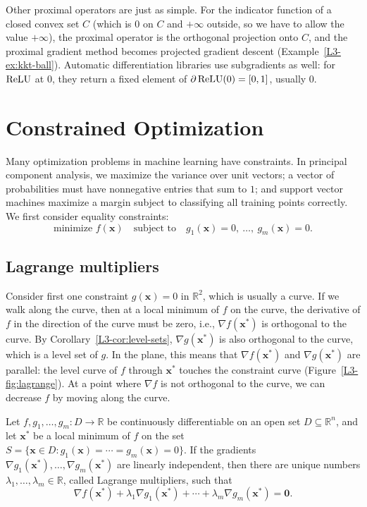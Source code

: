 Other proximal operators are just as simple. For the indicator function of a closed convex set $C$ (which is $0$ on $C$ and $+\infty$ outside, so we have to allow the value $+\infty$), the proximal operator is the orthogonal projection onto $C$, and the proximal gradient method becomes projected gradient descent (Example~\ref{L3-ex:kkt-ball}). Automatic differentiation libraries use subgradients as well: for $\operatorname{ReLU}$ at $0$, they return a fixed element of $\partial\operatorname{ReLU}(0) = [0, 1]$, usually $0$.

\section{Constrained Optimization}\label{L3-sec:constrained}

Many optimization problems in machine learning have constraints. In principal component analysis, we maximize the variance over unit vectors; a vector of probabilities must have nonnegative entries that sum to $1$; and support vector machines maximize a margin subject to classifying all training points correctly. We first consider equality constraints:
\[\text{minimize } f(\mathbf{x}) \quad \text{subject to} \quad g_1(\mathbf{x}) = 0, \ \ldots, \ g_m(\mathbf{x}) = 0.\]

\subsection{Lagrange multipliers}

Consider first one constraint $g(\mathbf{x}) = 0$ in $\mathbb{R}^2$, which is usually a curve. If we walk along the curve, then at a local minimum of $f$ on the curve, the derivative of $f$ in the direction of the curve must be zero, i.e., $\nabla f(\mathbf{x}^*)$ is orthogonal to the curve. By Corollary~\ref{L3-cor:level-sets}, $\nabla g(\mathbf{x}^*)$ is also orthogonal to the curve, which is a level set of $g$. In the plane, this means that $\nabla f(\mathbf{x}^*)$ and $\nabla g(\mathbf{x}^*)$ are parallel: the level curve of $f$ through $\mathbf{x}^*$ touches the constraint curve (Figure~\ref{L3-fig:lagrange}). At a point where $\nabla f$ is not orthogonal to the curve, we can decrease $f$ by moving along the curve.

\begin{theorem}\label{L3-thm:lagrange}
    Let $f, g_1, \ldots, g_m: D \to \mathbb{R}$ be continuously differentiable on an open set $D \subseteq \mathbb{R}^n$, and let $\mathbf{x}^*$ be a local minimum of $f$ on the set $S = \{\mathbf{x} \in D : g_1(\mathbf{x}) = \cdots = g_m(\mathbf{x}) = 0\}$. If the gradients $\nabla g_1(\mathbf{x}^*), \ldots, \nabla g_m(\mathbf{x}^*)$ are linearly independent, then there are unique numbers $\lambda_1, \ldots, \lambda_m \in \mathbb{R}$, called Lagrange multipliers, such that
    \[\nabla f(\mathbf{x}^*) + \lambda_1\nabla g_1(\mathbf{x}^*) + \cdots + \lambda_m\nabla g_m(\mathbf{x}^*) = \mathbf{0}.\]
\end{theorem}

